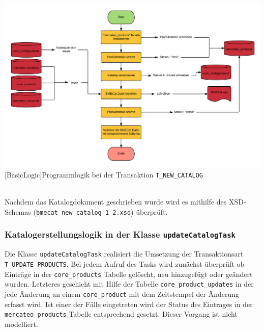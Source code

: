 	\begin{minipage}{\linewidth}
		\vspace{1em}
		\centering
		\includegraphics[width=1 \linewidth]{img/newCatalogComplete}
		[BasicLogic]{Programmlogik  bei der Transaktion \texttt{T\_NEW\_CATALOG}}
		\vspace{1em}
	\end{minipage}\\
	
	Nachdem das Katalogdokument geschrieben wurde wird es mithilfe des  XSD-Schemas (\texttt{bmecat\_new\_catalog\_1\_2.xsd}) überprüft. 
		
	\subsubsection{Katalogerstellungslogik in der Klasse \texttt{updateCatalogTask} }
    Die	Klasse \texttt{updateCatalogTask} realisiert die Umsetzung der Transaktionsart
	\texttt{T\_UPDATE\_PRODUCTS}.
	Bei jedem  Aufruf des Tasks wird zunächst überprüft ob Einträge in der \texttt{core\_products} Tabelle gelöscht, neu hinzugefügt oder geändert wurden. Letzteres geschieht mit Hilfe der Tabelle \texttt{core\_product\_updates} in der jede Änderung an einem \texttt{core\_product} mit dem Zeitstempel der Änderung erfasst wird. Ist einer der Fälle eingetreten wird der Status des Eintrages in der \texttt{mercateo\_products} Tabelle entsprechend gesetzt. Dieser Vorgang ist nicht modelliert.
	
